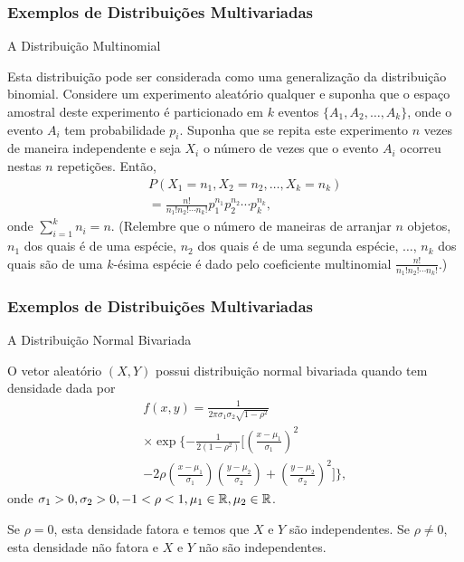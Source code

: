 \begin{frame}
\frametitle{\textbf{Exemplos de Distribuições Multivariadas}}
\baselineskip=13pt
\begin{block}{A Distribuição Multinomial}

Esta distribuição pode ser considerada como uma generalização da distribuição binomial. Considere um experimento aleatório qualquer e suponha que o espaço amostral deste experimento é particionado em $k$ eventos $\{A_1,A_2,\ldots,A_k\}$, onde o evento $A_i$ tem probabilidade $p_i$. Suponha que se repita este experimento $n$ vezes de maneira independente e seja $X_i$ o número de vezes que o evento $A_i$ ocorreu nestas $n$ repetições. Então,
\begin{eqnarray}
& & P(X_1=n_1,X_2=n_2,\ldots,X_k=n_k)\nonumber \\
& & =\frac{n!}{n_1!n_2!\cdots n_k!}p_1^{n_1}p_2^{n_2}\cdots p_k^{n_k},
\end{eqnarray}
onde $\sum_{i=1}^{k}n_i=n$. (Relembre que o número de maneiras de arranjar $n$ objetos, $n_1$ dos quais é de uma espécie, $n_2$ dos quais é de uma segunda espécie, $\ldots$, $n_k$ dos quais são de uma $k$-ésima espécie é dado pelo coeficiente multinomial $\frac{n!}{n_1!n_2!\cdots n_k!}$.)

\end{block}
\end{frame}

\begin{frame}
\frametitle{\textbf{Exemplos de Distribuições Multivariadas}}
\baselineskip=13pt
\begin{block}{A Distribuição Normal Bivariada}


O vetor aleatório $(X,Y)$ possui distribuição normal bivariada quando tem densidade dada por
\begin{eqnarray}
& & f(x,y)=\frac{1}{2\pi\sigma_1\sigma_2\sqrt{1-\rho^2}} \nonumber \\
& & \times  \exp\{-\frac{1}{2(1-\rho^2)}[(\frac{x-\mu_1}{\sigma_1})^2\nonumber \\
& & -2\rho(\frac{x-\mu_1}{\sigma_1})(\frac{y-\mu_2}{\sigma_2})+(\frac{y-\mu_2}{\sigma_2})^2]\}, \nonumber
\end{eqnarray}
onde $\sigma_1>0,\sigma_2>0,-1<\rho<1,\mu_1\in\mathbb{R},\mu_2\in\mathbb{R}$.

Se $\rho=0$, esta densidade fatora e temos que $X$ e $Y$ são independentes. Se $\rho\ne 0$, esta densidade não fatora e $X$ e $Y$ não são independentes.

\end{block}
\end{frame}

